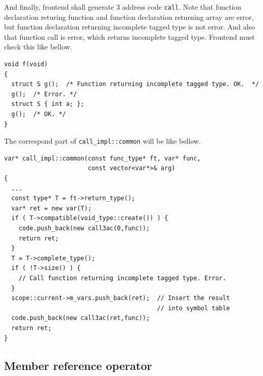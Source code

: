 And finally, frontend shall generate 3 address code {\tt{call}}.
Note that function declaration returing function and
function declaration returning array are error,
but function declaration returning incomplete tagged type
is not error. And also that function call is error, which 
returns incomplete tagged type. Frontend must check this like bellow.
\begin{verbatim}
void f(void)
{
  struct S g();  /* Function returning incomplete tagged type. OK.  */
  g();  /* Error. */
  struct S { int a; };
  g();  /* OK. */
}
\end{verbatim}
The correspond part of {\tt{call\_impl::common}} will be like bellow.
\begin{verbatim}
var* call_impl::common(const func_type* ft, var* func,
                       const vector<var*>& arg)
{
  ...
  const type* T = ft->return_type();
  var* ret = new var(T);
  if ( T->compatible(void_type::create()) ) {
    code.push_back(new call3ac(0,func));
    return ret;
  }
  T = T->complete_type();
  if ( !T->size() ) {
    // Call function returning incomplete tagged type. Error.
  }
  scope::current->m_vars.push_back(ret);  // Insert the result
                                          // into symbol table
  code.push_back(new call3ac(ret,func));
  return ret;
}
\end{verbatim}

\subsection{Member reference operator}
\label{expr_e024}

